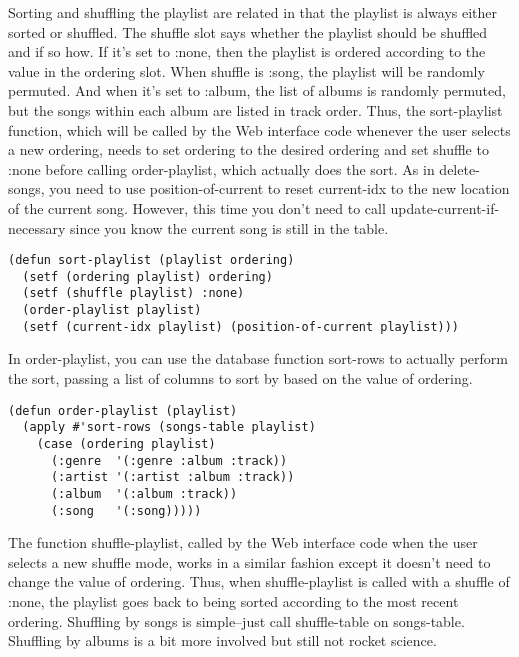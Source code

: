 Sorting and shuffling the playlist are related in that the playlist is always either
sorted or shuffled. The shuffle slot says whether the playlist should be shuffled and if
so how. If it's set to :none, then the playlist is ordered according to the value in the
ordering slot. When shuffle is :song, the playlist will be randomly permuted. And when
it's set to :album, the list of albums is randomly permuted, but the songs within each
album are listed in track order. Thus, the sort-playlist function, which will be called by
the Web interface code whenever the user selects a new ordering, needs to set ordering to
the desired ordering and set shuffle to :none before calling order-playlist, which
actually does the sort. As in delete-songs, you need to use position-of-current to reset
current-idx to the new location of the current song. However, this time you don't need to
call update-current-if-necessary since you know the current song is still in the table.

\begin{lstlisting}
(defun sort-playlist (playlist ordering)
  (setf (ordering playlist) ordering)
  (setf (shuffle playlist) :none)
  (order-playlist playlist)
  (setf (current-idx playlist) (position-of-current playlist)))
\end{lstlisting}

In order-playlist, you can use the database function sort-rows to actually perform the
sort, passing a list of columns to sort by based on the value of ordering.

\begin{lstlisting}
(defun order-playlist (playlist)
  (apply #'sort-rows (songs-table playlist)
    (case (ordering playlist)
      (:genre  '(:genre :album :track))
      (:artist '(:artist :album :track))
      (:album  '(:album :track))
      (:song   '(:song)))))
\end{lstlisting}

The function shuffle-playlist, called by the Web interface code when the user selects a
new shuffle mode, works in a similar fashion except it doesn't need to change the value of
ordering. Thus, when shuffle-playlist is called with a shuffle of :none, the playlist goes
back to being sorted according to the most recent ordering. Shuffling by songs is
simple--just call shuffle-table on songs-table. Shuffling by albums is a bit more involved
but still not rocket science.

